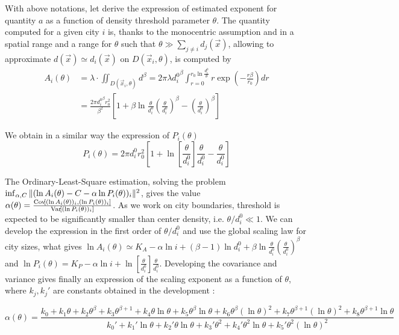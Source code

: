 With above notations, let derive the expression of estimated exponent for quantity $a$ as a function of density threshold parameter $\theta$. The quantity computed for a given city $i$ is, thanks to the monocentric assumption and in a spatial range and a range for $\theta$ such that $\theta \gg \sum_{j\neq i}{d_j(\vec{x})}$, allowing to approximate $d(\vec{x})\simeq d_i(\vec{x})$ on $D(\vec{x}_i,\theta)$, is computed by
\[
\begin{split}
A_i(\theta) & = \lambda\cdot \iint_{D(\vec{x}_i,\theta)}{d^\beta} = 2\pi\lambda {d_i^0}^{\beta} \int_{r=0}^{r_0 \ln{\frac{d_i^0}{\theta}}}{r\exp{\left(-\frac{r\beta}{r_0}\right)}dr}\\
& = \frac{2\pi {d_i^0}^\beta r_0^2}{\beta^2} \left[1 + \beta \ln{\frac{\theta}{d_i^0}\left(\frac{\theta}{d_i^0}\right)^\beta} - \left(\frac{\theta}{d_i^0}\right)^\beta\right]
\end{split}
\]

We obtain in a similar way the expression of $P_i(\theta)$
\[
P_i(\theta) = 2\pi d_i^0 r_0^2 \left[1 + \ln{\left[\frac{\theta}{d_i^0}\right]}\frac{\theta}{d_i^0} - \frac{\theta}{d_i^0}\right]
\]

The Ordinary-Least-Square estimation, solving the problem $\inf_{\alpha,C}\| (\ln{A_i(\theta)} - C - \alpha \ln{P_i(\theta)})_i \|^2$, gives the value $\alpha(\theta) = \frac{\operatorname{Cov}\!\left[(\ln{A_i(\theta)})_i,(\ln{P_i(\theta)})_i\right]}{\operatorname{Var}\!\left[(\ln{P_i(\theta)})_i\right]}$. As we work on city boundaries, threshold is expected to be significantly smaller than center density, i.e. $\theta / d_i^0 \ll 1$. We can develop the expression in the first order of $\theta / d_i^0$ and use the global scaling law for city sizes, what gives $\ln{A_i(\theta)} \simeq K_A - \alpha \ln{i} + (\beta - 1)\ln{d_i^0} + \beta \ln{\frac{\theta}{d_i^0}\left(\frac{\theta}{d_i^0}\right)^\beta} $ and $\ln{P_i(\theta)} = K_P - \alpha \ln{i} + \ln{\left[\frac{\theta}{d_i^0}\right]}\frac{\theta}{d_i^0}$. Developing the covariance and variance gives finally an expression of the scaling exponent as a function of $\theta$, where $k_j,{k_j}'$ are constants obtained in the development :

\begin{equation}
\label{eq:th}
\alpha(\theta) = \frac{k_0 + k_1 \theta + k_2 \theta^\beta + k_3 \theta^{\beta + 1} +  k_4 \theta \ln{\theta} + k_5 \theta^\beta \ln{\theta} + k_6 \theta^\beta (\ln{\theta})^2 + k_7 \theta^{\beta + 1}(\ln{\theta})^2 + k_8 \theta^{\beta + 1}\ln{\theta}}{k_0'+k_1' \ln{\theta} + k_2' \theta \ln{\theta} + k_3' \theta^2 + k_4' \theta^2\ln{\theta} + k_5' \theta^2 (\ln{\theta})^2}
\end{equation}

